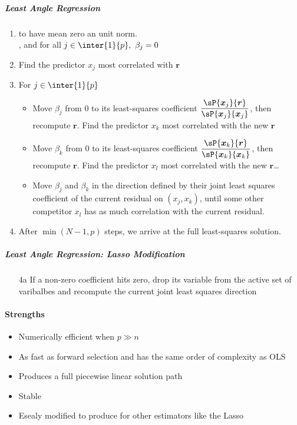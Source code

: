 \subparagraph{Least Angle Regression}
\begin{enumerate}
	\item {} to have mean zero an unit 
		norm.\\ , and for all $j\in\inter{1}{p},~\beta_{j}=0$
    \item Find the predictor $x_{j}$ most correlated with $\bm{r}$
    \item For $j\in\inter{1}{p}$
    \begin{itemize}
        \item Move $\beta_{j}$ from 0 to its least-squares coefficient
            $\dfrac{\sP{\bm{x}_{j}}{\bm{r}}}{\sP{\bm{x}_{j}}{\bm{x}_{j}}}$, then recompute 
            $\bm{r}$. Find the predictor $x_{k}$ most correlated with the new $\bm{r}$
        \item Move $\beta_{k}$ from 0 to its least-squares coefficient
            $\dfrac{\sP{\bm{x}_{k}}{\bm{r}}}{\sP{\bm{x}_{k}}{\bm{x}_{k}}}$, then recompute 
            $\bm{r}$. Find the predictor $x_{l}$ most correlated with the new $\bm{r}$\dots
        \item Move $\beta_{j}$ and $\beta_{k}$ in the direction defined
            by their joint least squares coefficient of the current
            residual on $(x_{j},x_{k})$, until some other 
            competitor $x_{l}$ has as much correlation with the
            current residual.
    \end{itemize}
	\item After $\min(N-1, p)$ steps, we arrive at the
		full least-squares solution.
\end{enumerate}

\subparagraph{Least Angle Regression: Lasso Modification}
\begin{itemize}
	\item[4a] If a non-zero coefficient hits zero, drop its variable from the
		active set of varibalbes and recompute the current joint least squares
		direction
\end{itemize}


\paragraph{Strengths}
\begin{itemize}
	\item Numerically efficient when $p\gg n$
	\item As fast as forward selection and has the same order of complexity as OLS
	\item Produces a full piecewise linear solution path
	\item Stable
	\item Esealy modified to produce for other estimators like the Lasso
\end{itemize}

